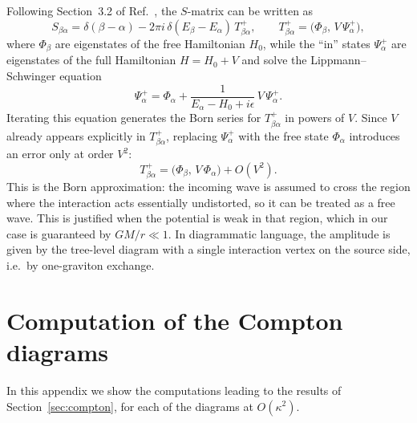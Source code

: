 \documentclass[12pt,a4paper,oneside]{article}
\numberwithin{equation}{section}   %
\begin{document}
Following Section~3.2 of Ref.~\cite{Weinberg1995}, the $S$-matrix can be
written as
\begin{equation}
    S_{\beta\alpha}=\delta(\beta-\alpha)
    -2\pi i\,\delta(E_\beta-E_\alpha)\,T^+_{\beta\alpha},
    \qquad
    T^+_{\beta\alpha}=\bigl(\Phi_\beta,\,V\,\Psi^+_\alpha\bigr),
\end{equation}
where $\Phi_\beta$ are eigenstates of the free Hamiltonian $H_0$, while the
``in'' states $\Psi^+_\alpha$ are eigenstates of the full Hamiltonian
$H=H_0+V$ and solve the Lippmann--Schwinger equation
\begin{equation}
    \Psi^+_\alpha=\Phi_\alpha
    +\frac{1}{E_\alpha-H_0+i\epsilon}\,V\,\Psi^+_\alpha .
\end{equation}
Iterating this equation generates the Born series for $T^+_{\beta\alpha}$
in powers of $V$. Since $V$ already appears explicitly in
$T^+_{\beta\alpha}$, replacing $\Psi^+_\alpha$ with the free state
$\Phi_\alpha$ introduces an error only at order $V^2$:
\begin{equation}
    T^+_{\beta\alpha}=\bigl(\Phi_\beta,\,V\,\Phi_\alpha\bigr)+O(V^2).
\end{equation}
This is the Born approximation: the incoming wave is assumed to cross the
region where the interaction acts essentially undistorted, so it can be
treated as a free wave. This is justified when the potential is weak in
that region, which in our case is guaranteed by $GM/r\ll1$. In
diagrammatic language, the amplitude is given by the tree-level diagram
with a single interaction vertex on the source side, i.e.\ by
one-graviton exchange.







\section{Computation of the Compton diagrams}
\label{app:compton}

In this appendix we show the computations leading to the results of
Section~\ref{sec:compton}, for each of the diagrams at $O(\kappa^2)$.
\end{document}
